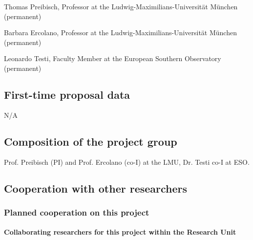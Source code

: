 \documentclass[10pt,fleqn,twoside]{article}
\begin{document}
Thomas Preibisch, Professor at the Ludwig-Maximilians-Universit\"at M\"unchen  (permanent)

Barbara Ercolano, Professor at the Ludwig-Maximilians-Universit\"at M\"unchen  (permanent)

Leonardo Testi, Faculty Member at the European Southern Observatory  (permanent)

\subsection{First-time proposal data}

N/A
\vspace{-2mm}

\subsection{Composition of the project group}

Prof. Preibisch (PI) and Prof. Ercolano (co-I) at the LMU, Dr. Testi
co-I at ESO. 


\subsection{Cooperation with other researchers}

\subsubsection{Planned cooperation on this project}

\paragraph{Collaborating researchers for this project within the
  Research Unit}

\end{document}
